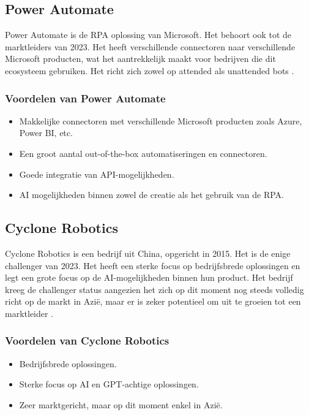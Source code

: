\subsection{Power Automate}
\label{subsec:power-automate}

Power Automate is de RPA oplossing van Microsoft. Het behoort ook tot de marktleiders van 2023. Het heeft verschillende connectoren naar verschillende Microsoft producten, wat het aantrekkelijk maakt voor bedrijven die dit ecosysteem gebruiken. Het richt zich zowel op attended als unattended bots \autocite{GartnerMicrosoftPA2023}.

\subsubsection{Voordelen van Power Automate}
\label{subsubsec:voordelen-van-power-automate}

\begin{itemize}
    \item Makkelijke connectoren met verschillende Microsoft producten zoals Azure, Power BI, etc.
    \item Een groot aantal out-of-the-box automatiseringen en connectoren.
    \item Goede integratie van API-mogelijkheden.
    \item AI mogelijkheden binnen zowel de creatie als het gebruik van de RPA.
\end{itemize}

\subsection{Cyclone Robotics}
\label{subsec:cyclone-robotics}

Cyclone Robotics is een bedrijf uit China, opgericht in 2015. Het is de enige challenger van 2023. Het heeft een sterke focus op bedrijfsbrede oplossingen en legt een grote focus op de AI-mogelijkheden binnen hun product. Het bedrijf kreeg de challenger status aangezien het zich op dit moment nog steeds volledig richt op de markt in Azië, maar er is zeker potentieel om uit te groeien tot een marktleider \autocite{GartnerCycloneRobotics2024}.

\subsubsection{Voordelen van Cyclone Robotics}
\label{subsubsec:voordelen-van-cyclone-robotics}

\begin{itemize}
    \item Bedrijfsbrede oplossingen.
    \item Sterke focus op AI en GPT-achtige oplossingen.
    \item Zeer marktgericht, maar op dit moment enkel in Azië.
\end{itemize}

